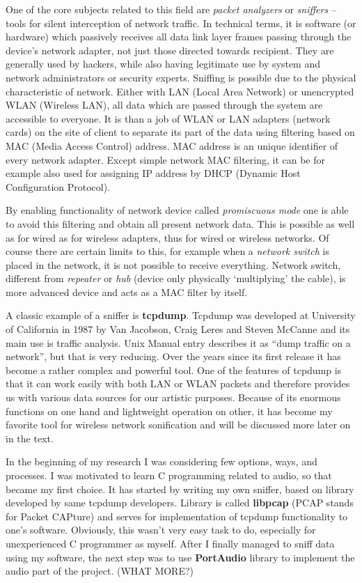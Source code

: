 \documentclass[11pt,a4paper,oneside]{report}
\begin{document}
One of the core subjects related to this field are \textit{packet analyzers} or \textit{sniffers} – tools for silent interception of network traffic. In technical terms, it is software (or hardware) which passively receives all data link layer frames passing through the device’s network adapter, not just those directed towards recipient. They are generally used by hackers, while also having legitimate use by system and network administrators or security experts. 
Sniffing is possible due to the physical characteristic of network. Either with LAN (Local Area Network) or unencrypted WLAN (Wireless LAN), all data which are passed through the system are accessible to everyone. It is than a job of WLAN or LAN adapters (network cards) on the site of client to separate its part of the data using filtering based on MAC (Media Access Control) address. MAC address is an unique identifier of every network adapter. Except simple network MAC filtering, it can be for example also used for assigning IP address by DHCP (Dynamic Host Configuration Protocol).

By enabling functionality of network device called \textit{promiscuous mode} one is able to avoid this filtering and obtain all present network data. This is possible as well as for wired as for wireless adapters, thus for wired or wireless networks. Of course there are certain limits to this, for example when a \textit{network switch} is placed in the network, it is not possible to receive everything. Network switch, different from \textit{repeater} or \textit{hub} (device only physically `multiplying' the cable), is more advanced device and acts as a MAC filter by itself. \cite{Pallavi2012}

A classic example of a sniffer is \textbf{tcpdump}. Tcpdump was developed at University of California in 1987 by Van Jacobson, Craig Leres and Steven McCanne and its main use is traffic analysis. Unix Manual entry describes it as ``dump traffic on a network'', but that is very reducing. Over the years since its first release it has become a rather complex and powerful tool. One of the features of tcpdump is that it can work easily with both LAN or WLAN packets and therefore provides us with various data sources for our artistic purposes. Because of its enormous functions on one hand and lightweight operation on other, it has become my favorite tool for wireless network sonification and will be discussed more later on in the text.

In the beginning of my research I was considering few options, ways, and processes. I was motivated to learn C programming related to audio, so that became my first choice. It has started by writing my own sniffer, based on library developed by same tcpdump developers. Library is called \textbf{libpcap} (PCAP stands for Packet CAPture) and serves for implementation of tcpdump functionality to one's software. Obviously, this wasn't very easy task to do, especially for unexperienced C programmer as myself. After I finally managed to sniff data using my software, the next step was to use \textbf{PortAudio} library to implement the audio part of the project. (WHAT MORE?)
\end{document}

